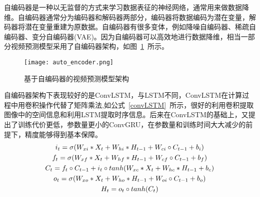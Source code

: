 自编码器是一种以无监督的方式来学习数据表征的神经网络，通常用来做数据降维。自编码器通常分为编码器和解码器两部分，编码器将数据编码为潜在变量，解码器将潜在变量重建为原数据。自编码器有很多变体，例如降噪自编码器、稀疏自编码器、变分自编码器(VAE)。因为自编码器可以高效地进行数据降维，相当一部分视频预测模型采用了自编码器架构，如图~\ref{auto_encoder}~所示。

\begin{figure}[h]
	\centering
	\texttt{[image: auto\_encoder.png]}
	\caption{基于自编码器的视频预测模型架构}
	\label{auto_encoder}
\end{figure}

自编码器架构下表现较好的是ConvLSTM，与LSTM不同，ConvLSTM在计算过程中用卷积操作代替了矩阵乘法,如公式~\ref{convLSTM}~所示，很好的利用卷积提取图像中的空间信息和利用LSTM提取时序信息。后来在ConvLSTM的基础上，又提出了训练代价更低，参数量更小的ConvGRU，在参数量和训练时间大大减少的前提下，精度能够得到基本保障。
\begin{equation}\label{convLSTM}
\begin{gathered}
$$
i_{t} = \sigma(W_{xi} \ast X_{t} + W_{hi} \ast H_{t-1} + W_{ci} \circ C_{t-1} + b_{i}) \\
f_{t} = \sigma(W_{xf} \ast X_{t} + W_{hf} \ast H_{t-1} + W_{cf} \circ C_{t-1} + b_{f})  \\
C_{t} = f_{t} \circ C_{t-1} + i_{t} \circ tanh(W_{xc} \ast X_{t} + W_{hc} \ast H_{t-1} + b_{c}) \\
o_{t} = \sigma(W_{xo} \ast X_{t} + W_{ho} \ast H_{t-1} + W_{oi} \circ C_{t-1} + b_{o})\\
H_{t} = o_{t} \circ tanh(C_{t})
$$
\end{gathered}
\end{equation}


